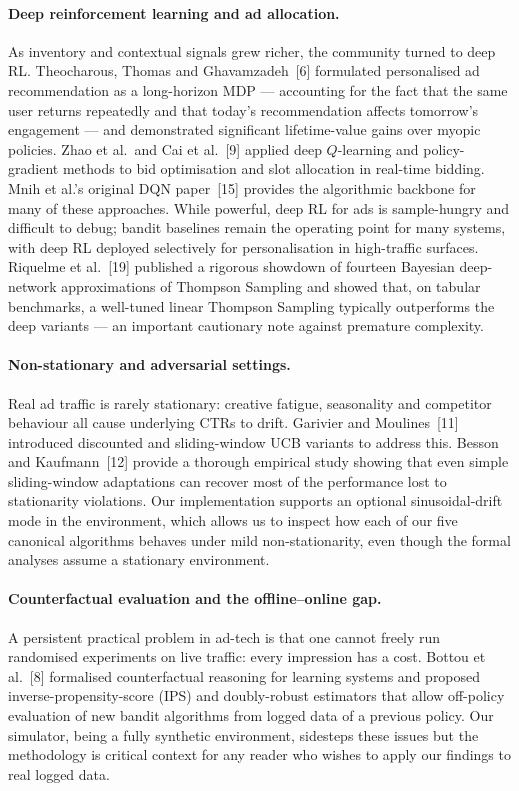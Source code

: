\paragraph{Deep reinforcement learning and ad allocation.}
As inventory and contextual signals grew richer, the community turned to deep RL. Theocharous, Thomas and Ghavamzadeh~[6] formulated personalised ad recommendation as a long-horizon MDP --- accounting for the fact that the same user returns repeatedly and that today's recommendation affects tomorrow's engagement --- and demonstrated significant lifetime-value gains over myopic policies. Zhao et al.\ and Cai et al.~[9] applied deep $Q$-learning and policy-gradient methods to bid optimisation and slot allocation in real-time bidding. Mnih et al.'s original DQN paper~[15] provides the algorithmic backbone for many of these approaches. While powerful, deep RL for ads is sample-hungry and difficult to debug; bandit baselines remain the operating point for many systems, with deep RL deployed selectively for personalisation in high-traffic surfaces. Riquelme et al.~[19] published a rigorous showdown of fourteen Bayesian deep-network approximations of Thompson Sampling and showed that, on tabular benchmarks, a well-tuned linear Thompson Sampling typically outperforms the deep variants --- an important cautionary note against premature complexity.

\paragraph{Non-stationary and adversarial settings.}
Real ad traffic is rarely stationary: creative fatigue, seasonality and competitor behaviour all cause underlying CTRs to drift. Garivier and Moulines~[11] introduced discounted and sliding-window UCB variants to address this. Besson and Kaufmann~[12] provide a thorough empirical study showing that even simple sliding-window adaptations can recover most of the performance lost to stationarity violations. Our implementation supports an optional sinusoidal-drift mode in the environment, which allows us to inspect how each of our five canonical algorithms behaves under mild non-stationarity, even though the formal analyses assume a stationary environment.

\paragraph{Counterfactual evaluation and the offline--online gap.}
A persistent practical problem in ad-tech is that one cannot freely run randomised experiments on live traffic: every impression has a cost. Bottou et al.~[8] formalised counterfactual reasoning for learning systems and proposed inverse-propensity-score (IPS) and doubly-robust estimators that allow off-policy evaluation of new bandit algorithms from logged data of a previous policy. Our simulator, being a fully synthetic environment, sidesteps these issues but the methodology is critical context for any reader who wishes to apply our findings to real logged data.

